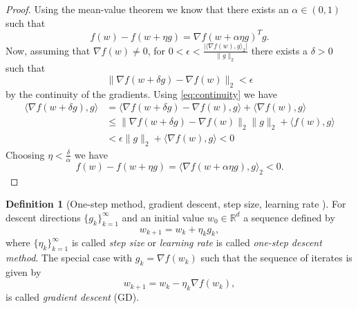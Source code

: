 \documentclass[12pt]{article}
\theoremstyle{definition}
\newtheorem{definition}[definition]{Definition}
\numberwithin{equation}{section}
\newcommand{\norm}[1]{\lVert{#1}\rVert_2}
\newcommand{\scp}[2]{\langle{#1}, {#2}\rangle_2}
\begin{document}
\begin{proof}
  Using the mean-value theorem we know that there exists an $\alpha \in (0,1)$ such that 
  \begin{equation}
    f(w) - f(w + \eta g) = \nabla f(w+\alpha\eta g)^Tg.
  \end{equation}
  Now, assuming that $\nabla f (w) \neq 0$, for $0 < \epsilon <
  \frac{\lvert\scp{\nabla f(w)}{g}\rvert}{\norm{g}}$ there exists a $\delta > 0$ such that 
  \begin{equation}
    \label{eq:continuity}
    \norm{\nabla f(w + \delta g) - \nabla f(w)} < \epsilon
  \end{equation}
  by the continuity of the gradients.
  Using \eqref{eq:continuity} we have
  \begin{equation}
    \begin{split}
      \langle\nabla f(w + \delta g), g \rangle &= \langle \nabla f(w + \delta g)- \nabla f(w), g \rangle + \langle \nabla f(w), g \rangle \\
      &\leq \norm{\nabla f(w + \delta g)- \nabla f(w)}\norm{g} + \langle f(w), g \rangle \\
      &< \epsilon \norm{g} + \langle \nabla f(w), g \rangle < 0
    \end{split}
  \end{equation}
  Choosing $\eta < \frac{\delta}{\alpha}$ we have
  \begin{equation}
    f(w) - f(w + \eta g) = \scp{\nabla f(w+\alpha\eta g)}{g} < 0.
  \end{equation}
\end{proof}
\begin{definition}[One-step method, gradient descent, step size, learning rate ]
  For descent directions $\{g_k\}_{k=1}^\infty$ and an initial value $w_{0}\in \mathbb{R}^d$ a sequence defined by
\begin{equation}
  w_{k+1} = w_{k} + \eta_k g_k,
\end{equation}
  where $\{\eta_k\}_{k=1}^\infty$ is called \emph{step size} or \emph{learning rate} is called \emph{one-step descent method}. The special case with $g_k = \nabla f(w_k)$ such that the sequence of iterates is given by
  \begin{equation}
    \label{eq:gradient_descent}
    w_{k+1} = w_{k} - \eta_k \nabla f(w_{k}),
  \end{equation}
  is called \emph{gradient descent} (GD).
\end{definition}
\end{document}
